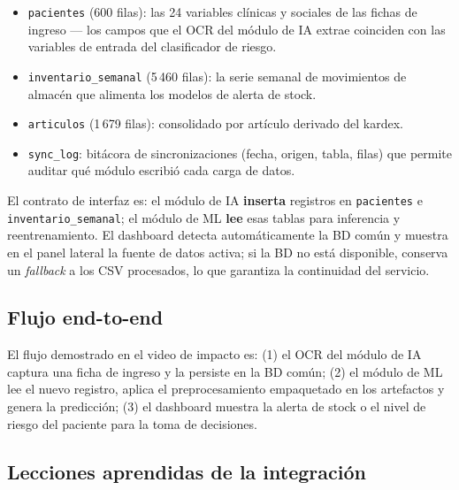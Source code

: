 \documentclass[12pt, a4paper]{article}
\begin{document}
\begin{itemize}[leftmargin=1.6em, itemsep=4pt]
  \item \texttt{pacientes} (600 filas): las 24 variables cl\'inicas y sociales de las fichas de ingreso --- los campos que el OCR del m\'odulo de IA extrae coinciden con las variables de entrada del clasificador de riesgo.
  \item \texttt{inventario\_semanal} (5\,460 filas): la serie semanal de movimientos de almac\'en que alimenta los modelos de alerta de stock.
  \item \texttt{articulos} (1\,679 filas): consolidado por art\'iculo derivado del kardex.
  \item \texttt{sync\_log}: bit\'acora de sincronizaciones (fecha, origen, tabla, filas) que permite auditar qu\'e m\'odulo escribi\'o cada carga de datos.
\end{itemize}

El contrato de interfaz es: el m\'odulo de IA \textbf{inserta} registros en \texttt{pacientes} e \texttt{inventario\_semanal}; el m\'odulo de ML \textbf{lee} esas tablas para inferencia y reentrenamiento. El dashboard detecta autom\'aticamente la BD com\'un y muestra en el panel lateral la fuente de datos activa; si la BD no est\'a disponible, conserva un \emph{fallback} a los CSV procesados, lo que garantiza la continuidad del servicio.

\subsection{Flujo end-to-end}

El flujo demostrado en el video de impacto es: (1) el OCR del m\'odulo de IA captura una ficha de ingreso y la persiste en la BD com\'un; (2) el m\'odulo de ML lee el nuevo registro, aplica el preprocesamiento empaquetado en los artefactos y genera la predicci\'on; (3) el dashboard muestra la alerta de stock o el nivel de riesgo del paciente para la toma de decisiones.

\subsection{Lecciones aprendidas de la integraci\'on}
\end{document}
